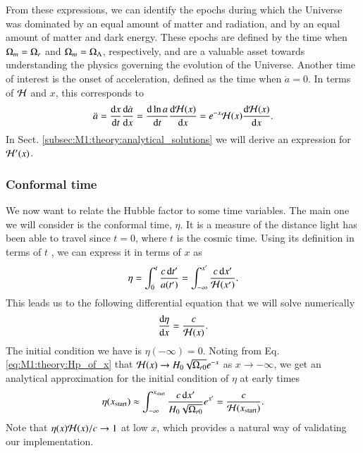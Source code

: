 From these expressions, we can identify the epochs during which the Universe was dominated by an equal amount of matter and radiation, and by an equal amount of matter and dark energy. These epochs are defined by the time when $\Omega_{m}=\Omega_{r}$ and $\Omega_{m}=\Omega_{\Lambda}$, respectively, and are a valuable asset towards understanding the physics governing the evolution of the Universe. Another time of interest is the onset of acceleration, defined as the time when $\ddot{a}=0$. In terms of $\mathcal{H}$ and $x$, this corresponds to 
\begin{equation}
    \ddot{a} = \dv{x}{t}\dv{\dot{a}}{x}=\dv{\ln a}{t}\dv{\mathcal{H}(x)}{x} = e^{-x} \mathcal{H}(x) \dv{\mathcal{H}(x)}{x}. \label{eq:M1:theory:acceleration_onset}
\end{equation}   
In Sect. \ref{subsec:M1:theory:analytical_solutions} we will derive an expression for $\mathcal{H}'(x)$. 

\subsubsection{Conformal time} \label{sssec:M1:theory:conformal_time}
We now want to relate the Hubble factor to some time variables. The main one we will consider is the conformal time, $\eta$. It is a measure of the distance light has been able to travel since $t=0$, where $t$ is the cosmic time. Using its definition in terms of $t$ \cite[Eq. (2.90)]{Dodelson}, we can express it in terms of $x$ as 
\begin{equation}
    \eta = \int_0^t \frac{c \, \dd t'}{a(t')} = \int_{-\infty}^{x'} \frac{c\,\dd x'}{\mathcal{H}(x')}. \label{eq:M1:theory:eta_of_x_integral_expression}
\end{equation}
%
This leads us to the following differential equation that we will solve numerically 
\begin{equation}
    \dv{\eta}{x} = \frac{c}{\mathcal{H}(x)}. \label{eq:M1:theory:eta_ODE}
\end{equation}
%
The initial condition we have is $\eta(-\infty)=0$. Noting from Eq. \eqref{eq:M1:theory:Hp_of_x} that $\mathcal{H}(x)\to H_0\sqrt{\Omega_{r0}}e^{-x}$ as $x\to-\infty$, we get an analytical approximation for the initial condition of $\eta$ at early times 
\begin{align}
    \eta(x_\mathrm{start}) \approx \int_{-\infty}^{x_\mathrm{start}} \frac{c\,\dd x'}{H_0\sqrt{\Omega_{r0}}} e^{x'} = \frac{c}{\mathcal{H}(x_\mathrm{start})}. \label{eq:M1:theory:eta_of_xstart_analytical_approximation}
\end{align} 
%
Note that $\eta(x)\mathcal{H}(x)/c\to 1$ at low $x$, which provides a natural way of validating our implementation.    

